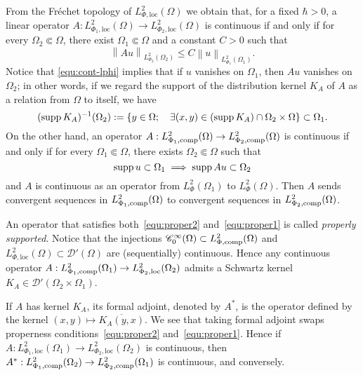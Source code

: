 \documentclass{article}
\newcommand{\loc}{\mathrm{loc}}
\newcommand{\norm}[1]{\left\|#1\right\|}
\newcommand{\lphi}{L^2_\Phi}
\newcommand{\Cinf}{\mathscr{C}^\infty}
\newcommand{\spt}{\mathop{\textup{supp}}}
\newcommand{\h}{\hbar}
\begin{document}
From the Fréchet topology of $L_{ \Phi,\loc}^{2}(\Omega)$ we obtain
that, for a fixed $\h>0$, a linear operator
$A:L_{ \Phi_1,\loc}^{2}(\Omega) \to L_{ \Phi_2,\loc}^{2}(\Omega)$ is
continuous if and only if for every $\Omega_2\Subset\Omega$, there
exist $\Omega_1\Subset\Omega$ and a constant $C>0$ such that
\begin{equation}
  \norm{A u}_{L^2_{\Phi_2}(\Omega_2)} \leq C \norm{u}_{L^2_{\Phi_1}(\Omega_1)}.
  \label{equ:cont-lphi}
\end{equation}
Notice that \eqref{equ:cont-lphi} implies that if $u$ vanishes on
$\Omega_1$, then $Au$ vanishes on $\Omega_2$; in other words, if we
regard the support of the distribution kernel $K_A$ of $A$ as a
relation from $\Omega$ to itself, we have
\begin{equation}
  (\spt K_A)^{-1}(\Omega_2):= \{y\in\Omega; \quad \exists (x,y)\in
  (\spt K_A)\cap \Omega_2\times \Omega\} \subset \Omega_1.
  \label{equ:proper2}
\end{equation}
On the other hand, an operator
$A:L_{ \Phi_1,\textup{comp}}^{2}(\Omega) \to L_{
  \Phi_2,\textup{comp}}^{2}(\Omega)$
is continuous if and only if for every $\Omega_1\Subset\Omega$, there
exists $\Omega_2\Subset\Omega$ such that
\begin{equation}
  \spt u \subset\Omega_1 \implies \spt Au \subset \Omega_2
  \label{equ:proper1}
\end{equation}
and $A$ is continuous as an operator from $\lphi(\Omega_1)$ to
$\lphi(\Omega)$. Then $A$ sends convergent sequences in
$ L_{ \Phi_1,\textup{comp}}^{2}(\Omega)$ to convergent sequences in
$ L_{ \Phi_2,\textup{comp}}^{2}(\Omega)$.

An operator that satisfies both~\eqref{equ:proper2}
and~\eqref{equ:proper1} is called \emph{properly supported}.  Notice
that the injections
$\Cinf_0(\Omega)\subset L^2_{\Phi,\textup{comp}}(\Omega)$ and
$L^2_{\Phi,\loc}(\Omega)\subset \mathscr{D}'(\Omega)$ are
(sequentially) continuous.  Hence any continuous operator
$A:L_{ \Phi_1,\textup{comp}}^{2}(\Omega_1) \to L_{
  \Phi_2,\loc}^{2}(\Omega_2)$
admits a Schwartz kernel
$K_A\in\mathscr{D}'(\Omega_2\times \Omega_1)$.

If $A$ has kernel $K_A$, its formal adjoint, denoted by $A^*$, is the
operator defined by the kernel $(x,y)\mapsto \overline{K_A(y,x)}$.  We
see that taking formal adjoint swaps properness
conditions~\eqref{equ:proper2} and~\eqref{equ:proper1}. Hence if
$A:L_{ \Phi_1,\loc}^{2}(\Omega_1) \to L_{ \Phi_2,\loc}^{2}(\Omega_2)$
is continuous, then
$A^*:L_{ \Phi_1,\textup{comp}}^{2}(\Omega_2) \to L_{
  \Phi_2,\textup{comp}}^{2}(\Omega_1)$ is continuous, and conversely.
\end{document}
